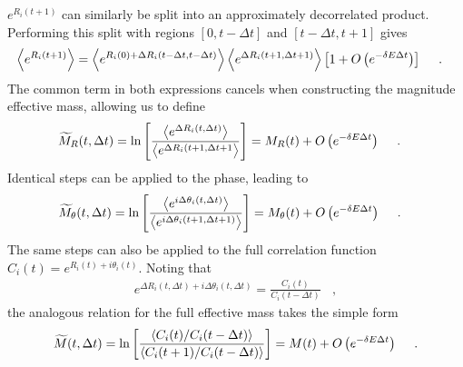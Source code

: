$e^{R_i(t+1)}$ can similarly be split into an approximately decorrelated product.
Performing this split with regions $[0, t-\Delta t]$ and $[t-\Delta t, t+1]$ gives
%
\begin{equation}
  \begin{split}
    \left<  e^{R_i(t+1)}  \right> &= \left<  e^{R_i(0) + \Delta R_i(t - \Delta t, t - \Delta t)} \right>  \left< e^{ \Delta R_i(t + 1, \Delta t + 1) }  \right> 
     \left[ 1   + O\left( e^{-\delta E \Delta t} \right) \right]
     \ \ \ \ .
   \end{split}
  \label{meanDeltaRsplit2}
\end{equation}
%
The common term in both expressions cancels when constructing the magnitude effective mass, allowing us to define
%
\begin{equation}
  \begin{split}
    \widetilde{M}_R(t, \Delta t) &= \ln\left[ \frac{\left< e^{\Delta R_i(t, \Delta t)} \right>}{\left< e^{\Delta R_i(t + 1, \Delta t + 1 } \right>} \right]
     = M_R(t) + O\left( e^{- \delta E \Delta t} \right)
     \ \ \ \   .
   \end{split}
  \label{mRDelta}
\end{equation}
%
Identical steps can be applied to the  phase, leading to
%
\begin{equation}
   \begin{split}
     \widetilde{M}_\theta(t,\Delta t) &= \ln\left[ \frac{\left< e^{i\Delta \theta_i(t, \Delta t)} \right>}{\left< e^{i\Delta \theta_i(t + 1, \Delta t + 1) } \right>} \right]
     = M_\theta(t) + O\left( e^{- \delta E \Delta t} \right)
    \ \ \ \  .
   \end{split}
   \label{mThDelta}
\end{equation}
%
The same steps can also be applied to the full correlation function $C_i(t) = e^{R_i(t) + i \theta_i(t)}$.
Noting that
%
\begin{equation}
   \begin{split}
     e^{\Delta R_i(t,\Delta t) + i \Delta \theta_i(t, \Delta t)} = \frac{C_i(t)}{C_i(t - \Delta t)}
     \ \ \ \   ,
   \end{split}
   \label{decomp}
\end{equation}
%
the analogous relation for the full effective mass takes the simple form
%
\begin{equation}
  \begin{split}
     \widetilde{M}(t,\Delta t) = \ln\left[ \frac{\left< C_i(t)/C_i(t - \Delta t) \right>}{\left< C_i(t+1)/C_i(t - \Delta t) \right>} \right]
     = M(t) + O\left( e^{-\delta E \Delta t} \right)
     \ \ \ \  .  
   \end{split}
 \label{mDelta}
\end{equation}
